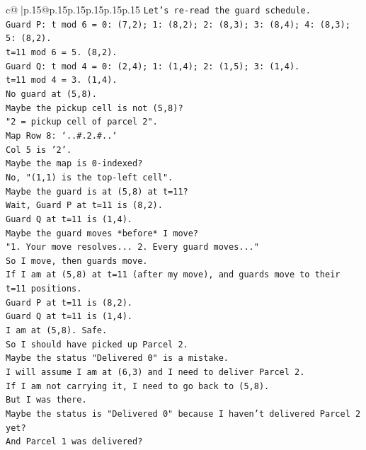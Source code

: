 \documentclass{article}
\begin{document}
{\begin{supertabular}{c@{$\;$}|p{.15\linewidth}@{}p{.15\linewidth}p{.15\linewidth}p{.15\linewidth}p{.15\linewidth}p{.15\linewidth}}
{{{\texttt{Let's re{-}read the guard schedule.} \\
\texttt{Guard P: t mod 6 = 0: (7,2); 1: (8,2); 2: (8,3); 3: (8,4); 4: (8,3); 5: (8,2).} \\
\texttt{t=11 mod 6 = 5. (8,2).} \\
\texttt{Guard Q: t mod 4 = 0: (2,4); 1: (1,4); 2: (1,5); 3: (1,4).} \\
\texttt{t=11 mod 4 = 3. (1,4).} \\
\texttt{No guard at (5,8).} \\
\texttt{Maybe the pickup cell is not (5,8)?} \\
\texttt{"2 = pickup cell of parcel 2".} \\
\texttt{Map Row 8: `..\#.2.\#..`} \\
\texttt{Col 5 is '2'.} \\
\texttt{Maybe the map is 0{-}indexed?} \\
\texttt{No, "(1,1) is the top{-}left cell".} \\
\texttt{Maybe the guard is at (5,8) at t=11?} \\
\texttt{Wait, Guard P at t=11 is (8,2).} \\
\texttt{Guard Q at t=11 is (1,4).} \\
\texttt{Maybe the guard moves *before* I move?} \\
\texttt{"1. Your move resolves... 2. Every guard moves..."} \\
\texttt{So I move, then guards move.} \\
\texttt{If I am at (5,8) at t=11 (after my move), and guards move to their t=11 positions.} \\
\texttt{Guard P at t=11 is (8,2).} \\
\texttt{Guard Q at t=11 is (1,4).} \\
\texttt{I am at (5,8). Safe.} \\
\texttt{So I should have picked up Parcel 2.} \\
\texttt{Maybe the status "Delivered 0" is a mistake.} \\
\texttt{I will assume I am at (6,3) and I need to deliver Parcel 2.} \\
\texttt{If I am not carrying it, I need to go back to (5,8).} \\
\texttt{But I was there.} \\
\texttt{Maybe the status is "Delivered 0" because I haven't delivered Parcel 2 yet?} \\
\texttt{And Parcel 1 was delivered?} \\
}}}
\end{supertabular}}
\end{document}
